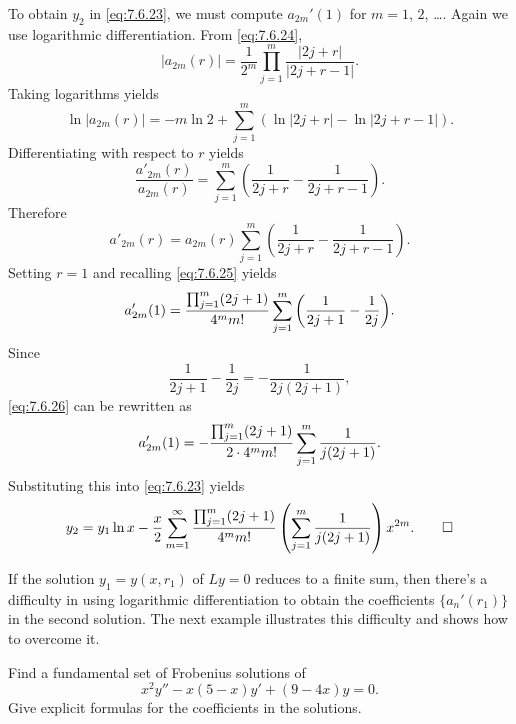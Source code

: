 \begin{solution}
To obtain $y_2$ in \eqref{eq:7.6.23}, we must compute $a_{2m}'(1)$
for $m=1$, $2$, \dots. Again we use logarithmic differentiation. From
\eqref{eq:7.6.24},
\[
|a_{2m}(r)|=\frac{1}{2^m}\prod_{j=1}^m\frac{|2j+r|}{|2j+r-1|}.
\]
Taking logarithms yields
\[
\ln |a_{2m}(r)|=-m\ln2+ \sum^m_{j=1} \left(\ln
|2j+r|-\ln|2j+r-1|\right).
\]
Differentiating with respect to $r$ yields
\[
\frac{a'_{2m}(r)}{a_{2m}(r)}=\sum^m_{j=1} \left(\frac{1}{2j+r}-\frac{1}{2j+r-1}\right).
\]
Therefore
\[
a'_{2m}(r)=a_{2m}(r) \sum^m_{j=1} \left(\frac{1}{2j+r}-\frac{1}{2j+r-1}\right).
\]
Setting $r=1$  and recalling \eqref{eq:7.6.25} yields
\begin{equation} \label{eq:7.6.26}
a'_{2m}(1)=\displaystyle{\frac{\prod_{j=1}^m(2j+1)}{4^mm!}
\sum_{j=1}^m\left(\frac{1}{2j+1}-\frac{1}{2j}\right)}.
\end{equation}
Since
\[
\frac{1}{2j+1}-\frac{1}{2j}=-\frac{1}{2j(2j+1)},
\]
\eqref{eq:7.6.26} can be rewritten as
\[
a_{2m}'(1)=-\displaystyle{\frac{\prod_{j=1}^m(2j+1)}{2\cdot4^mm!}
\sum_{j=1}^m\frac{1}{j(2j+1)}}.
\]
Substituting this into \eqref{eq:7.6.23} yields
\[
y_2=y_1\ln
x-\frac{x}{2}\sum_{m=1}^\infty\frac{\prod_{j=1}^m(2j+1)}{4^mm!}
\left(\sum_{j=1}^m\frac{1}{j(2j+1)}\right)x^{2m}. \qedhere
\]
\end{solution}

If the solution $y_1=y(x,r_1)$ of $Ly=0$ reduces to a finite sum, then
there's a
difficulty in using logarithmic differentiation to obtain the coefficients
$\{a_n'(r_1)\}$ in the second solution. The next example illustrates
this difficulty and shows how to overcome it.

\begin{example}\label{example:7.6.4}
Find a fundamental set of Frobenius solutions of
\begin{equation} \label{eq:7.6.27}
x^2y''-x(5-x)y'+(9-4x)y=0.
\end{equation}
Give explicit formulas for the coefficients in the solutions.
\end{example}

